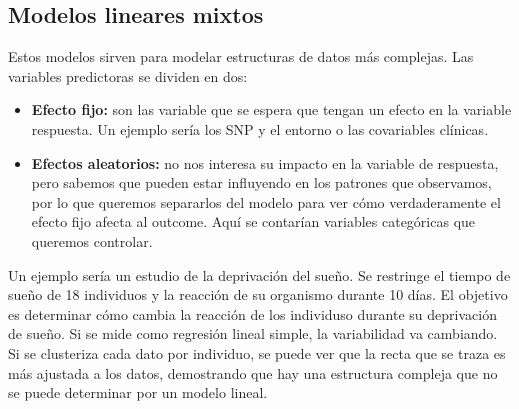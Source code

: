 \subsection{Modelos lineares mixtos}
Estos modelos sirven para modelar estructuras de datos más complejas. Las variables predictoras se dividen en dos:
\begin{itemize}
\item \textbf{Efecto fijo:} son las variable que se espera que tengan un efecto en la variable respuesta. Un ejemplo sería los SNP y el entorno o las covariables clínicas.
\item \textbf{Efectos aleatorios:} no nos interesa su impacto en la variable de respuesta, pero sabemos que pueden estar influyendo en los patrones que observamos, por lo que queremos separarlos del modelo para ver cómo verdaderamente el efecto fijo afecta al outcome. Aquí se contarían variables categóricas que queremos controlar.
\end{itemize}

Un ejemplo sería un estudio de la deprivación del sueño. Se restringe el tiempo de sueño de 18 individuos y la reacción de su organismo durante 10 días. El objetivo es determinar cómo cambia la reacción de los individuso durante su deprivación de sueño. Si se mide como regresión lineal simple, la variabilidad va cambiando. Si se clusteriza cada dato por individuo, se puede ver que la recta que se traza es más ajustada a los datos, demostrando que hay una estructura compleja que no se puede determinar por un modelo lineal.

